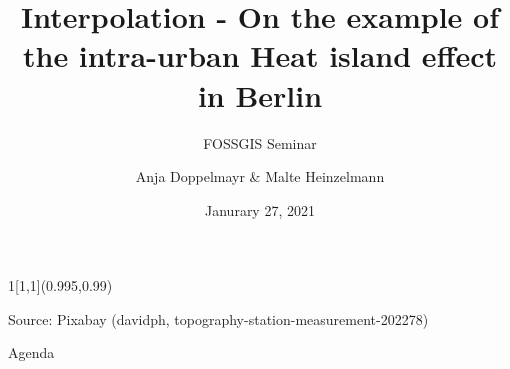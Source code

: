 \documentclass[aspectratio=169]{beamer}
\title{Interpolation - On the example of the intra-urban Heat island effect in Berlin}
\subtitle{FOSSGIS Seminar}
\date{Janurary 27, 2021}
\author{Anja Doppelmayr \& Malte Heinzelmann}
\institute{Ruprecht-Karls-Universit\"at Heidelberg}
\newlength\beamerleftmargin
\newenvironment*{env}{}{}
\begin{document}
	\begin{frame}[plain]
		\begin{textblock}{1}[1,1](0.995,0.99)
			\setlength\topsep{0pt}
			\begin{flushright}
				\tiny\color{text} Source: Pixabay (davidph, topography-station-measurement-202278)%
			\end{flushright}
		\end{textblock}
		\titlepage
	\end{frame}

	\begin{frame}{Agenda}
		\tableofcontents[]
	\end{frame}

	

	
	
	
	
	
	
	
	

	
	
\end{document}
